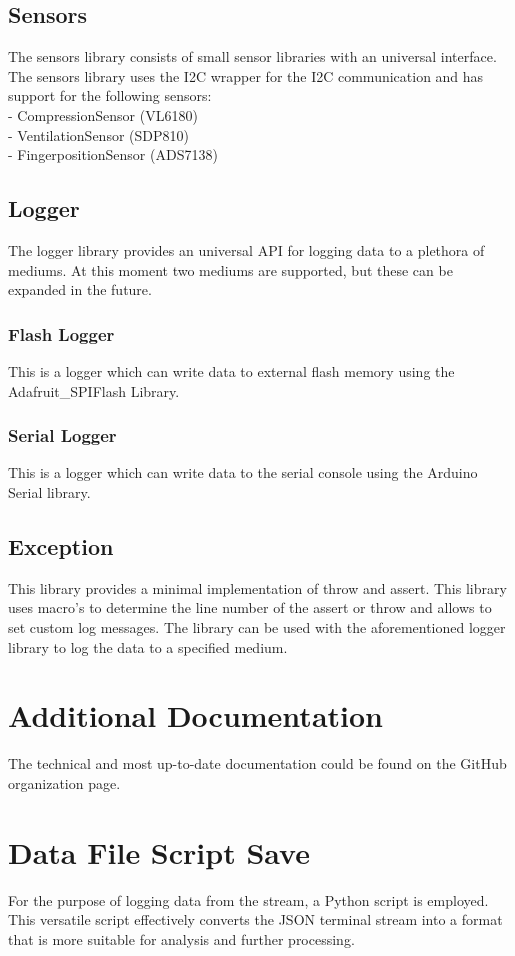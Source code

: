 \subsection{Sensors}
The sensors library consists of small sensor libraries with an universal interface. The sensors library uses the I2C wrapper for the I2C communication and has support for the following sensors:\\
- CompressionSensor (VL6180)\\
- VentilationSensor (SDP810)\\
- FingerpositionSensor (ADS7138) \\
\subsection{Logger}
The logger library provides an universal API for logging data to a plethora of mediums. At this moment two mediums are supported, but these can be expanded in the future.
\subsubsection{Flash Logger}
This is a logger which can write data to external flash memory using the Adafruit\_SPIFlash Library.
\subsubsection{Serial Logger}
This is a logger which can write data to the serial console using the Arduino Serial library.
\subsection{Exception}
This library provides a minimal implementation of throw and assert. This library uses macro's to determine the line number of the assert or throw and allows to set custom log messages. The library can be used with the aforementioned logger library to log the data to a specified medium.
\section{Additional Documentation}
The technical and most up-to-date documentation could be found on the GitHub organization page. 
\section{Data File Script Save}
For the purpose of logging data from the stream, a Python script is employed. This versatile script effectively converts the JSON terminal stream into a format that is more suitable for analysis and further processing.
